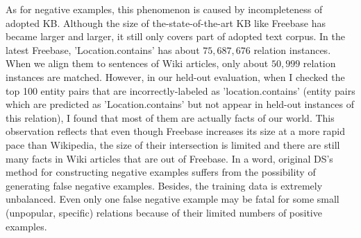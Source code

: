 \documentclass[10pt]{article} %
\theoremstyle{definition}
\theoremstyle{definition}
\begin{document}
As for negative examples, this phenomenon is caused by incompleteness of adopted KB. 
Although the size of the-state-of-the-art KB like Freebase has became larger and larger, it still only covers part of adopted text corpus. 
In the latest Freebase, 'Location.contains' has about $75,687,676$ relation instances. 
When we align them to sentences of Wiki articles, only about $50,999$ relation instances are matched. 
However, in our held-out evaluation, when I checked the top 100 entity pairs that are incorrectly-labeled as 'location.contains' 
(entity pairs which are predicted as 'Location.contains' but not appear in held-out instances of this relation), 
I found that most of them are actually facts of our world. 
This observation reflects that even though Freebase increases its size at a more rapid pace than Wikipedia, 
the size of their intersection is limited and there are still many facts in Wiki articles that are out of Freebase. 
In a word, original DS's method for constructing negative examples suffers from the possibility of generating false negative examples. 
Besides, the training data is extremely unbalanced. 
Even only one false negative example may be fatal for some small (unpopular, specific) relations because of their limited numbers of positive examples. 
\end{document}
